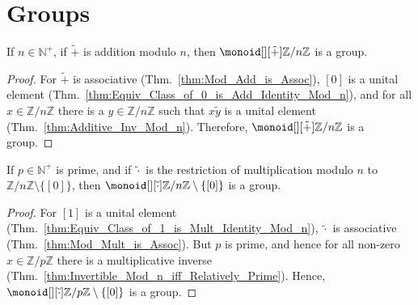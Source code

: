 \documentclass{article}                                                        %
\begin{document}
    \section{Groups}
        \begin{theorem}
            If $n\in\mathbb{N}^{+}$, if $\tilde{+}$ is addition modulo $n$,
            then $\monoid[][\tilde{+}]{\mathbb{Z}/n\mathbb{Z}}$ is a group.
        \end{theorem}
        \begin{proof}
            For $\tilde{+}$ is associative (Thm.~\ref{thm:Mod_Add_is_Assoc}),
            $[0]$ is a unital element
            (Thm.~\ref{thm:Equiv_Class_of_0_is_Add_Identity_Mod_n}), and
            for all $x\in\mathbb{Z}/n\mathbb{Z}$ there is a
            $y\in\mathbb{Z}/n\mathbb{Z}$ such that $x\tilde{y}$ is a unital
            element (Thm.~\ref{thm:Additive_Inv_Mod_n}). Therefore,
            $\monoid[][\tilde{+}]{\mathbb{Z}/n\mathbb{Z}}$ is a group.
        \end{proof}
        \begin{theorem}
            If $p\in\mathbb{N}^{+}$ is prime, and if $\tilde{\cdot}$ is the
            restriction of multiplication modulo $n$ to
            $\mathbb{Z}/n\mathbb{Z}\setminus\{[0]\}$, then
            $\monoid[][\tilde{\cdot}]{\mathbb{Z}/n\mathbb{Z}\setminus\{[0]\}}$
            is a group.
        \end{theorem}
        \begin{proof}
            For $[1]$ is a unital element
            (Thm.~\ref{thm:Equiv_Class_of_1_is_Mult_Identity_Mod_n}),
            $\tilde{\cdot}$ is associative (Thm.~\ref{thm:Mod_Mult_is_Assoc}).
            But $p$ is prime, and hence for all non-zero
            $x\in\mathbb{Z}/p\mathbb{Z}$ there is a multiplicative inverse
            (Thm.~\ref{thm:Invertible_Mod_n_iff_Relatively_Prime}). Hence,
            $\monoid[][\tilde{\cdot}]{\mathbb{Z}/p\mathbb{Z}\setminus\{[0]\}}$
            is a group.
        \end{proof}
\end{document}
